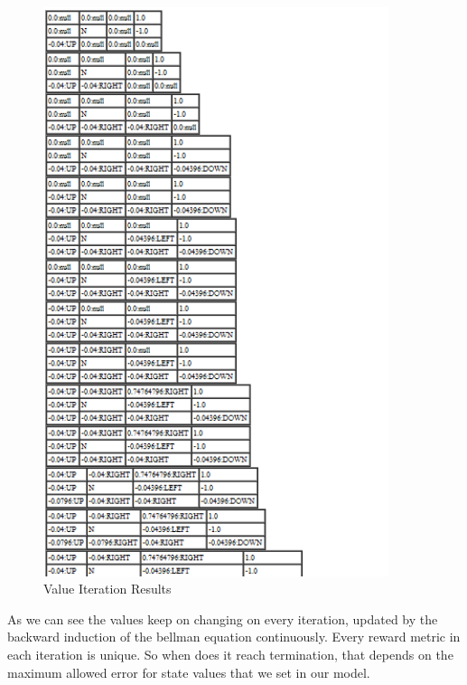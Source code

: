 \begin{figure}[h!]
    \label{fig:ValueIterationResults}
    \begin{center}
        \includegraphics[width=0.90\textwidth]{Figures/Planning_Figure_2.png}
        \caption{Value Iteration Results}
    \end{center}
\end{figure}

As we can see the values keep on changing on every iteration, updated by the
backward induction of the bellman equation continuously. Every reward metric in
each iteration is unique. So when does it reach termination, that depends on the
maximum allowed error for state values that we set in our model. 

